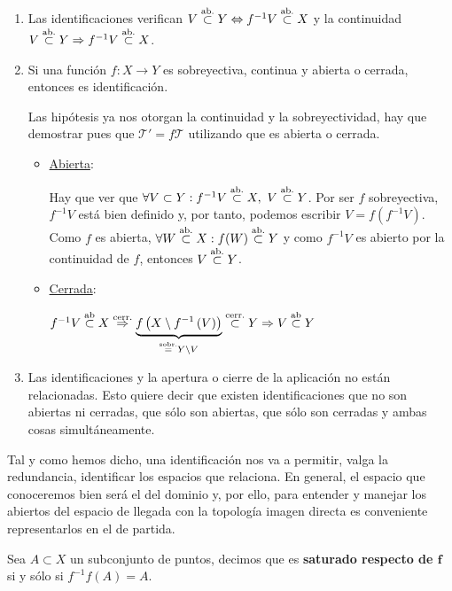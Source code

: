 \begin{obs}
\begin{enumerate}
    \item Las identificaciones verifican $V \stackrel{\text{ab.}}{\subset} Y \Leftrightarrow f^{-1}V \stackrel{\text{ab.}}{\subset} X$ y la continuidad $V \stackrel{\text{ab.}}{\subset} Y \Rightarrow f^{-1}V \stackrel{\text{ab.}}{\subset} X$.

	\item Si una función $f: X \rightarrow Y$ es sobreyectiva, continua y abierta o cerrada, entonces es identificación.
	\begin{demo}
	Las hipótesis ya nos otorgan la continuidad y la sobreyectividad, hay que demostrar pues que $\mathcal{T}' = f\mathcal{T}$ utilizando que es abierta o cerrada.
	\begin{itemize}
		\item \underline{Abierta}:
	
		Hay que ver que $\forall V \subset Y : f^{-1} V \stackrel{\text{ab.}}{\subset} X, \ V \stackrel{\text{ab.}}{\subset} Y$. Por ser $f$ sobreyectiva, $f^{-1}V$ está bien definido y, por tanto, podemos escribir $V=f(f^{-1}V)$. Como $f$ es abierta, $\forall W \stackrel{\text{ab.}}{\subset} X : f(W) \stackrel{\text{ab.}}{\subset} Y$ y como $f^{-1}V$ es abierto por la continuidad de $f$, entonces $V \stackrel{\text{ab.}}{\subset} Y$.
		
		\item \underline{Cerrada}:
		
		$f^{-1}V \stackrel{\text{ab}}{\subset} X \stackrel{\text{cerr.}}{\Rightarrow} \underbrace{f \left( X \setminus f^{-1}\left( V \right) \right)}_{\stackrel{\text{sobr.}}{=} Y\setminus V}  \stackrel{\text{cerr.}}{\subset} Y \Rightarrow V \stackrel{\text{ab}}{\subset} Y$		
	\end{itemize}
	\end{demo}
	
	 \item Las identificaciones y la apertura o cierre de la aplicación no están relacionadas. Esto quiere decir que existen identificaciones que no son abiertas ni cerradas, que sólo son abiertas, que sólo son cerradas y ambas cosas simultáneamente.
\end{enumerate}
\end{obs}

Tal y como hemos dicho, una identificación nos va a permitir, valga la redundancia, identificar los espacios que relaciona. En general, el espacio que conoceremos bien será el del dominio y, por ello, para entender y manejar los abiertos del espacio de llegada con la topología imagen directa es conveniente representarlos en el de partida.

\begin{defi}
Sea $A \subset X$ un subconjunto de puntos, decimos que es \textbf{saturado respecto de $\boldsymbol{f}$} si y sólo si $f^{-1}f\left( A \right) = A$.
\end{defi}

